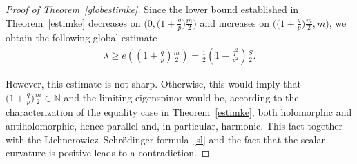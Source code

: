 \documentclass[pdftex]{sigma}
\numberwithin{equation}{section}
\theoremstyle{definition}
\begin{document}
\begin{proof}[Proof of Theorem~\ref{globestimke}]
\hspace{0.01cm} Since the lower bound established in Theorem~\ref{estimke} decreases on $\big(0,\big(1+\frac{q}{p}\big)\frac{m}{2}\big)$ and increases on $\big(\big(1+\frac{q}{p}\big)\frac{m}{2},m\big)$, we obtain the following global estimate
\begin{gather*}\lambda\geq e\left(\left(1+\frac{q}{p}\right)\frac{m}{2}\right)=\frac{1}{2}\left(1-\frac{q^2}{p^2}\right)\frac{S}{2}.\end{gather*}

However, this estimate is not sharp. Otherwise, this would imply that $\big(1+\frac{q}{p}\big)\frac{m}{2}\in\mathbb{N}$ and the limiting eigenspinor would be, according to the characterization of the equality case in Theo\-rem~\ref{estimke}, both holomorphic and antiholomorphic, hence parallel and, in particular, harmonic. This fact together with the Lichnerowicz--Schr\"odinger formula~\eqref{sl} and the fact that the scalar curvature is positive leads to a contradiction.


\end{proof}
\end{document}
